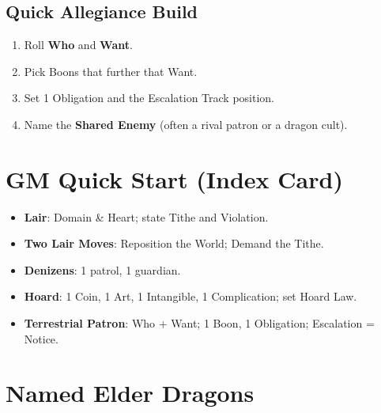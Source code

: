 \documentclass[11pt,letterpaper]{article}
\begin{document}
\subsection{Quick Allegiance Build}
\begin{enumerate}
\item Roll \textbf{Who} and \textbf{Want}.
\item Pick Boons that further that Want.
\item Set 1 Obligation and the Escalation Track position.
\item Name the \textbf{Shared Enemy} (often a rival patron or a dragon cult).
\end{enumerate}

\section{GM Quick Start (Index Card)}
\begin{itemize}
\item \textbf{Lair}: Domain \& Heart; state Tithe and Violation.
\item \textbf{Two Lair Moves}: Reposition the World; Demand the Tithe.
\item \textbf{Denizens}: 1 patrol, 1 guardian.
\item \textbf{Hoard}: 1 Coin, 1 Art, 1 Intangible, 1 Complication; set Hoard Law.
\item \textbf{Terrestrial Patron}: Who + Want; 1 Boon, 1 Obligation; Escalation = Notice.
\end{itemize}

\section{Named Elder Dragons}


\end{document}

